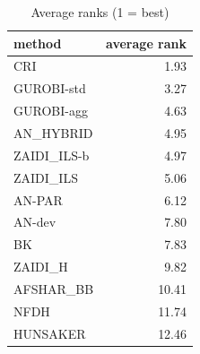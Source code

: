 \begin{table}[htbp]
\centering
\small
\caption{Average ranks (1 = best)}
\label{tab:E10a_state_of_the_art_b10_ranks}
\begin{tabular}{lr}
\toprule
method & average rank \\
\midrule
CRI & 1.93 \\
GUROBI-std & 3.27 \\
GUROBI-agg & 4.63 \\
AN\_HYBRID & 4.95 \\
ZAIDI\_ILS-b & 4.97 \\
ZAIDI\_ILS & 5.06 \\
AN-PAR & 6.12 \\
AN-dev & 7.80 \\
BK & 7.83 \\
ZAIDI\_H & 9.82 \\
AFSHAR\_BB & 10.41 \\
NFDH & 11.74 \\
HUNSAKER & 12.46 \\
\bottomrule
\end{tabular}
\end{table}
